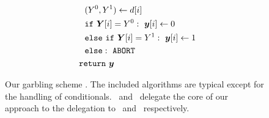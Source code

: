 \begin{figure}
\begin{adjustwidth}{-0.1\textwidth}{-0.1\textwidth}
\begin{minipage}[t]{0.40\linewidth}
\begin{align*}
      &~~~~(Y^0, Y^1) \gets d[i]\\
      &~~~~\cif~\gcirout[i] = Y^0:~\cirout[i] \gets 0\\
      &~~~~\celse~\cif~\gcirout[i] = Y^1:~\cirout[i] \gets 1\\
      &~~~~\celse:~\mathtt{ABORT}\\
      &~~\creturn~\cirout
    \end{align*}
  \end{minipage}
  \end{adjustwidth}
  \caption{%
    Our garbling scheme \ourschemelong.
    The included algorithms are typical except for the handling of
    conditionals.
    \gEv\ and \gGb\ delegate the core of our approach to
    the delegation to
    \evcond\ and \gbcond\ respectively.
  }\label{fig:scheme}
\end{figure}

